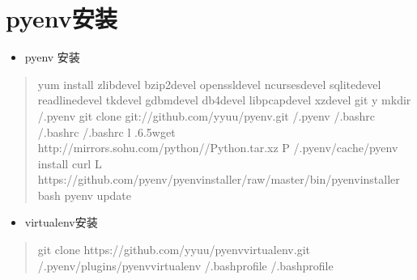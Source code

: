 \documentclass[a4paper,10pt,english]{sphinxmanual}
\begin{document}
\section{pyenv安装}
\label{\detokenize{python/pyenv:pyenv}}\label{\detokenize{python/pyenv::doc}}\begin{itemize}
\item {} 
pyenv 安装

\end{itemize}
\begin{quote}

\begin{sphinxVerbatim}[commandchars=\\\{\}]
yum install zlib\PYGZhy{}devel bzip2\PYGZhy{}devel openssl\PYGZhy{}devel ncurses\PYGZhy{}devel sqlite\PYGZhy{}devel readline\PYGZhy{}devel tk\PYGZhy{}devel gdbm\PYGZhy{}devel db4\PYGZhy{}devel libpcap\PYGZhy{}devel xz\PYGZhy{}devel git \PYGZhy{}y
mkdir \PYGZti{}/.pyenv
git clone git://github.com/yyuu/pyenv.git \PYGZti{}/.pyenv
  \PYGZgt{}\PYGZgt{} \PYGZti{}/.bashrc
  \PYGZgt{}\PYGZgt{} \PYGZti{}/.bashrc
  \PYGZgt{}\PYGZgt{} \PYGZti{}/.bashrc
  \PYGZhy{}l
.6.5wget http://mirrors.sohu.com/python//Python\PYGZhy{}.tar.xz \PYGZhy{}P \PYGZti{}/.pyenv/cache/pyenv install 
curl \PYGZhy{}L https://github.com/pyenv/pyenv\PYGZhy{}installer/raw/master/bin/pyenv\PYGZhy{}installer  bash
pyenv update
\end{sphinxVerbatim}
\end{quote}
\begin{itemize}
\item {} 
virtualenv安装

\end{itemize}
\begin{quote}

\begin{sphinxVerbatim}[commandchars=\\\{\}]
git clone https://github.com/yyuu/pyenv\PYGZhy{}virtualenv.git  \PYGZti{}/.pyenv/plugins/pyenv\PYGZhy{}virtualenv
  \PYGZgt{}\PYGZgt{} \PYGZti{}/.bash\PYGZus{}profile
 \PYGZti{}/.bash\PYGZus{}profile
\end{sphinxVerbatim}
\end{quote}
\end{document}
